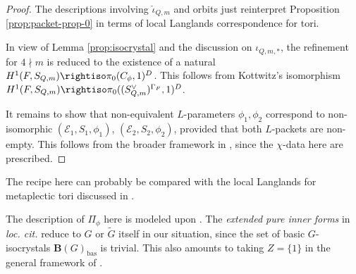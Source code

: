 \documentclass[a4paper,10pt]{article}
\begin{document}
\begin{proof}
	The descriptions involving $\check{\iota}_{Q,m}$ and orbits just reinterpret Proposition \ref{prop:packet-prop-0} in terms of local Langlands correspondence for tori.
	
	In view of Lemma \ref{prop:isocrystal} and the discussion on $\iota_{Q,m,*}$, the refinement for $4 \nmid m$ is reduced to the existence of a natural $H^1(F,S_{Q,m}) \rightiso \pi_0(C_\phi, 1)^D$. This follows from Kottwitz's isomorphism $H^1(F, S_{Q,m}) \rightiso \pi_0((S_{Q,m}^\vee)^{\Gamma_F}, 1)^D$.
	

	It remains to show that non-equivalent $L$-parameters $\phi_1, \phi_2$ correspond to non-isomorphic $(\mathcal{E}_1, S_1, \phi_1)$, $(\mathcal{E}_2, S_2, \phi_2)$, provided that both $L$-packets are non-empty. This follows from the broader framework in \cite[Proposition 5.2.4]{Kal16},  since the $\chi$-data here are prescribed.
\end{proof}

\begin{remark}\label{rem:comparison-GG-tori}
	The recipe here can probably be compared with the local Langlands for metaplectic tori discussed in \cite[\S\S 8.1--8.3]{GG}.
\end{remark}

\begin{remark}
	The description of $\Pi_\phi$ here is modeled upon \cite{Kal15}. The \emph{extended pure inner forms} in \textit{loc. cit.} reduce to $G$ or $\tilde{G}$ itself in our situation, since the set of basic $G$-isocrystals $\mathbf{B}(G)_\text{bas}$ is trivial. This also amounts to taking $Z = \{1\}$ in the general framework of \cite{Kal16a}.
\end{remark} %
\end{document}
